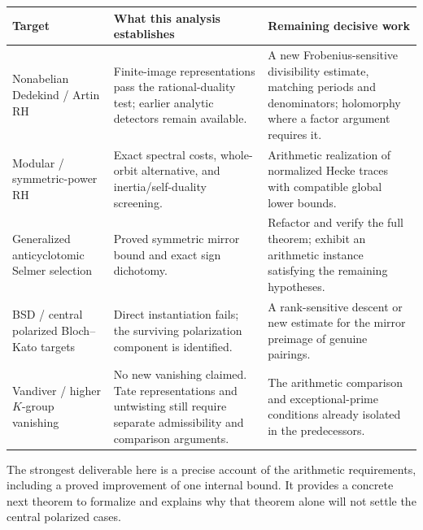 \begin{longtable}{@{}>{\raggedright\arraybackslash}p{}>{\raggedright\arraybackslash}p{}>{\raggedright\arraybackslash}p{}@{}}
\toprule
Target & What this analysis establishes & Remaining decisive work\\\midrule
\endhead
Nonabelian Dedekind / Artin RH & Finite-image representations pass the
rational-duality test; earlier analytic detectors remain available. & A
new Frobenius-sensitive divisibility estimate, matching periods and
denominators; holomorphy where a factor argument requires it.\\
Modular / symmetric-power RH & Exact spectral costs, whole-orbit alternative,
and inertia/self-duality screening. & Arithmetic realization of normalized
Hecke traces with compatible global lower bounds.\\
Generalized anticyclotomic Selmer selection & Proved symmetric mirror bound
and exact sign dichotomy. & Refactor and verify the full theorem; exhibit
an arithmetic instance satisfying the remaining hypotheses.\\
BSD / central polarized Bloch--Kato targets & Direct instantiation fails;
the surviving polarization component is identified. & A rank-sensitive
descent or new estimate for the mirror preimage of genuine pairings.\\
Vandiver / higher $K$-group vanishing & No new vanishing claimed. Tate
representations and untwisting still require separate admissibility and
comparison arguments. & The arithmetic comparison and exceptional-prime
conditions already isolated in the predecessors.\\
\bottomrule
\end{longtable}

The strongest deliverable here is a precise account of the arithmetic
requirements, including a proved improvement of one internal bound. It
provides a concrete next theorem to formalize and explains why that theorem
alone will not settle the central polarized cases.
